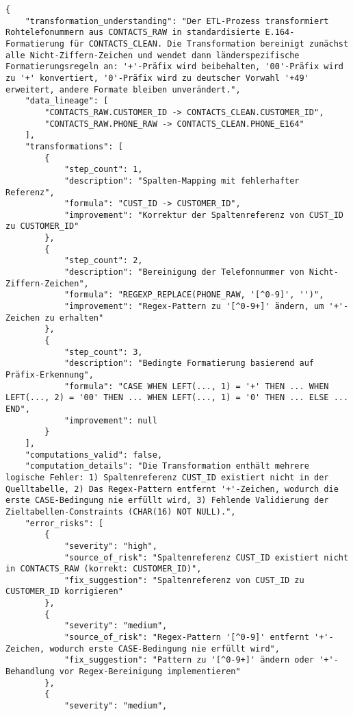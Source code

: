 \begin{lstlisting}[caption={Ausgabe: Claude Sonnet 4 Anwendungsfall 3 Robustheitsdurchlauf},label={claude_case3_prompt3}]
{
    "transformation_understanding": "Der ETL-Prozess transformiert Rohtelefonummern aus CONTACTS_RAW in standardisierte E.164-Formatierung für CONTACTS_CLEAN. Die Transformation bereinigt zunächst alle Nicht-Ziffern-Zeichen und wendet dann länderspezifische Formatierungsregeln an: '+'-Präfix wird beibehalten, '00'-Präfix wird zu '+' konvertiert, '0'-Präfix wird zu deutscher Vorwahl '+49' erweitert, andere Formate bleiben unverändert.",
    "data_lineage": [
        "CONTACTS_RAW.CUSTOMER_ID -> CONTACTS_CLEAN.CUSTOMER_ID",
        "CONTACTS_RAW.PHONE_RAW -> CONTACTS_CLEAN.PHONE_E164"
    ],
    "transformations": [
        {
            "step_count": 1,
            "description": "Spalten-Mapping mit fehlerhafter Referenz",
            "formula": "CUST_ID -> CUSTOMER_ID",
            "improvement": "Korrektur der Spaltenreferenz von CUST_ID zu CUSTOMER_ID"
        },
        {
            "step_count": 2,
            "description": "Bereinigung der Telefonnummer von Nicht-Ziffern-Zeichen",
            "formula": "REGEXP_REPLACE(PHONE_RAW, '[^0-9]', '')",
            "improvement": "Regex-Pattern zu '[^0-9+]' ändern, um '+'-Zeichen zu erhalten"
        },
        {
            "step_count": 3,
            "description": "Bedingte Formatierung basierend auf Präfix-Erkennung",
            "formula": "CASE WHEN LEFT(..., 1) = '+' THEN ... WHEN LEFT(..., 2) = '00' THEN ... WHEN LEFT(..., 1) = '0' THEN ... ELSE ... END",
            "improvement": null
        }
    ],
    "computations_valid": false,
    "computation_details": "Die Transformation enthält mehrere logische Fehler: 1) Spaltenreferenz CUST_ID existiert nicht in der Quelltabelle, 2) Das Regex-Pattern entfernt '+'-Zeichen, wodurch die erste CASE-Bedingung nie erfüllt wird, 3) Fehlende Validierung der Zieltabellen-Constraints (CHAR(16) NOT NULL).",
    "error_risks": [
        {
            "severity": "high",
            "source_of_risk": "Spaltenreferenz CUST_ID existiert nicht in CONTACTS_RAW (korrekt: CUSTOMER_ID)",
            "fix_suggestion": "Spaltenreferenz von CUST_ID zu CUSTOMER_ID korrigieren"
        },
        {
            "severity": "medium",
            "source_of_risk": "Regex-Pattern '[^0-9]' entfernt '+'-Zeichen, wodurch erste CASE-Bedingung nie erfüllt wird",
            "fix_suggestion": "Pattern zu '[^0-9+]' ändern oder '+'-Behandlung vor Regex-Bereinigung implementieren"
        },
        {
            "severity": "medium",

\end{lstlisting}

